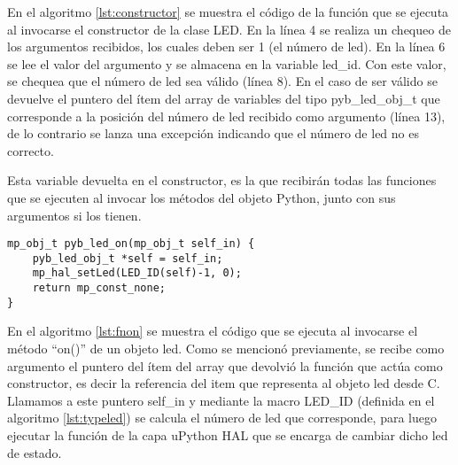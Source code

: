 En el algoritmo \ref{lst:constructor} se muestra el código de la función que se ejecuta al invocarse el constructor de la clase LED. En la línea 4 se realiza un chequeo de los argumentos recibidos, los cuales deben ser 1 (el número de led). En la línea 6 se lee el valor del argumento y se almacena en la variable led\_id. Con este valor, se chequea que el número de led sea válido (línea 8). En el caso de ser válido se devuelve el puntero del ítem del array de variables del tipo pyb\_led\_obj\_t que corresponde a la posición del número de led recibido como argumento (línea 13), de lo contrario se lanza una excepción indicando que el número de led no es correcto.

Esta variable devuelta en el constructor, es la que recibirán todas las funciones que se ejecuten al invocar los métodos del objeto Python, junto con sus argumentos si los tienen.

\begin{lstlisting}[label={lst:fnon},caption=Definición de la función que se ejecuta al invocar el método on().] 
mp_obj_t pyb_led_on(mp_obj_t self_in) {
    pyb_led_obj_t *self = self_in;
    mp_hal_setLed(LED_ID(self)-1, 0);
    return mp_const_none;
}
\end{lstlisting}

En el algoritmo \ref{lst:fnon} se muestra el código que se ejecuta al invocarse el método “on()” de un objeto led. Como se mencionó previamente, se recibe como argumento el puntero del ítem del array que devolvió la función que actúa como constructor, es decir la referencia del item que representa al objeto led desde C. Llamamos a este puntero self\_in y mediante la macro LED\_ID (definida en el algoritmo \ref{lst:typeled}) se calcula el número de led que corresponde, para luego ejecutar la función de la capa uPython HAL que se encarga de cambiar dicho led de estado.





